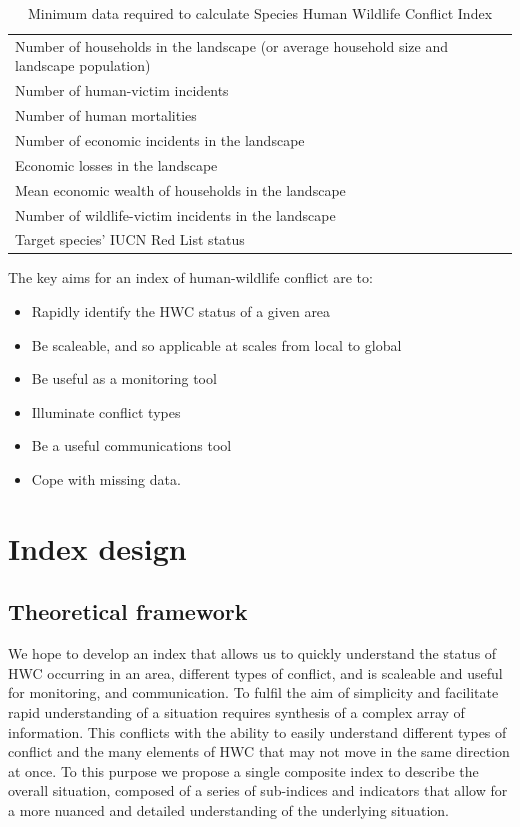 \documentclass[fleqn,10pt]{olplainarticle}
\begin{document}
\begin{table}[!h]
    \centering
    \caption{Minimum data required to calculate Species Human Wildlife Conflict Index}
    \label{tab:min_data}
    \begin{tabular}{>{\raggedright\arraybackslash}p{13cm}}
         Number of households in the landscape (or average household size  and landscape population) \\
         Number of human-victim incidents  \\
         Number of human mortalities \\
         Number of economic incidents in the landscape \\
         Economic losses in the landscape \\
         Mean economic wealth of households in the landscape \\
         Number of wildlife-victim incidents in the landscape \\
         Target species' IUCN Red List status \\
          
    \end{tabular}
\end{table}


The key aims for an index of human-wildlife conflict are to:
\begin{itemize}
    \item Rapidly identify the HWC status of a given area
    \item Be scaleable, and so applicable at scales from local to global
    \item Be useful as a monitoring tool
	\item Illuminate conflict types
    \item Be a useful communications tool
    \item Cope with missing data.
\end{itemize}


\section*{Index design}

\subsection*{Theoretical framework}
We hope to develop an index that allows us to quickly understand the status of HWC occurring in an area, different types of conflict, and is scaleable and useful for monitoring, and communication. To fulfil the aim of simplicity and facilitate rapid understanding of a situation requires synthesis of a complex array of information. This conflicts with the ability to easily understand different types of conflict and the many elements of HWC that may not move in the same direction at once. To this purpose we propose a single composite index to describe the overall situation, composed of a series of sub-indices and indicators that allow for a more nuanced and detailed understanding of the underlying situation.
\end{document}
